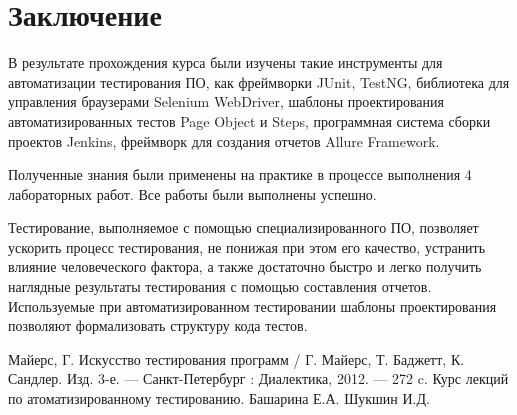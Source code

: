 \documentclass[a4paper]{article}
\begin{document}
    \section*{Заключение}
    В результате прохождения курса были изучены такие инструменты для автоматизации тестирования ПО, как фреймворки JUnit, TestNG, библиотека для управления браузерами Selenium WebDriver, шаблоны проектирования автоматизированных тестов Page Object и Steps, программная система сборки проектов Jenkins, фреймворк для создания отчетов Allure Framework. \par
    Полученные знания были применены на практике в процессе выполнения 4 лабораторных работ. Все работы были выполнены успешно. \par
    Тестирование, выполняемое с помощью специализированного ПО, позволяет ускорить процесс тестирования, не понижая при этом его качество, устранить влияние человеческого фактора, а также достаточно быстро и легко получить наглядные результаты тестирования с помощью составления отчетов. Используемые при автоматизированном тестировании шаблоны проектирования позволяют формализовать структуру кода тестов.
    \newpage

    \begin{thebibliography}{2}
        Майерс, Г. Искусство тестирования программ / Г. Майерс, Т. Баджетт, К. Сандлер. Изд. 3-е. — Санкт-Петербург : Диалектика, 2012. — 272 c.
        Курс лекций по атоматизированному тестированию. Башарина Е.А. Шукшин И.Д.
    \end{thebibliography}
    \newpage
    
\end{document}
